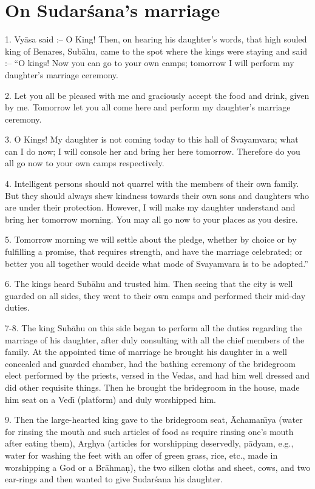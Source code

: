 \chapter{On Sudar\'sana's marriage}

1. Vy\=asa said :-- O King! Then, on hearing his daughter's words, that high souled king of Benares, Sub\=ahu, came to the spot where the kings were staying and said :-- ``O kings! Now you can go to your own camps; tomorrow I will perform my daughter's marriage ceremony.

2. Let you all be pleased with me and graciously accept the food and drink, given by me. Tomorrow let you all come here and perform my daughter's marriage ceremony.

3. O Kings! My daughter is not coming today to this hall of Svayamvara; what can I do now; I will console her and bring her here tomorrow. Therefore do you all go now to your own camps respectively.

4. Intelligent persons should not quarrel with the members of their own family. But they should always shew kindness towards their own sons and daughters who are under their protection. However, I will make my daughter understand and bring her tomorrow morning. You may all go now to your places as you desire.

5. Tomorrow morning we will settle about the pledge, whether by choice or by fulfilling a promise, that requires strength, and have the marriage celebrated; or better you all together would decide what mode of Svayamvara is to be adopted.''

6. The kings heard Sub\=ahu and trusted him. Then seeing that the city is well guarded on all sides, they went to their own camps and performed their mid-day duties.

7-8. The king Sub\=ahu on this side began to perform all the duties regarding the marriage of his daughter, after duly consulting with all the chief members of the family. At the appointed time of marriage he brought his daughter in a well concealed and guarded chamber, had the bathing ceremony of the bridegroom elect performed by the priests, versed in the Vedas, and had him well dressed and did other requisite things. Then he brought the bridegroom in the house, made him seat on a Ved\={\i} (platform) and duly worshipped him.

9. Then the large-hearted king gave to the bridegroom seat, \=Achaman\={\i}ya (water for rinsing the mouth and such articles of food as require rinsing one's mouth after eating them), Arghya (articles for worshipping deservedly, p\=adyam, e.g., water for washing the feet with an offer of green grass, rice, etc., made in worshipping a God or a Br\=ahma\d{n}), the two silken cloths and sheet, cows, and two ear-rings and then wanted to give Sudar\'sana his daughter.

